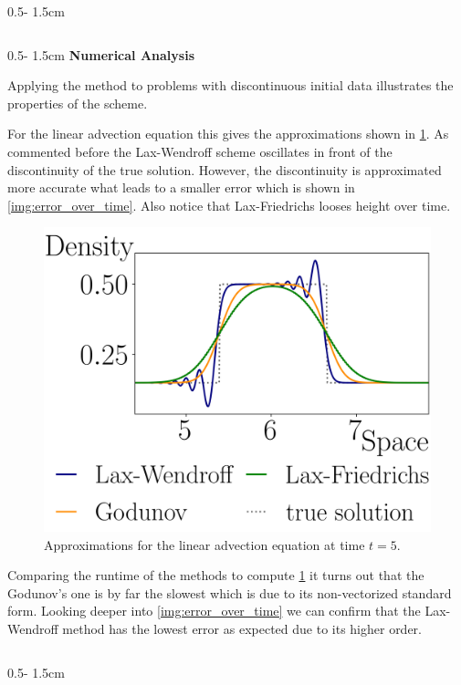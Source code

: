 \documentclass{uibposter}
\begin{document}
\begin{frame}[fragile]
\begin{columns}
\begin{column}{0.5\textwidth - 1.5cm}
\begin{column}{0.5\textwidth - 1.5cm}
\vspace{0.5cm}
\textbf{Numerical Analysis}
\vspace{0.5cm}
    
Applying the method to problems with discontinuous initial data illustrates the properties of the scheme.

\vspace{0.5cm}
For the linear advection equation this gives the approximations shown in \cref{img:linar_comprehension}. 
As commented before the Lax-Wendroff scheme oscillates in front of the discontinuity of the true solution. However, the discontinuity is approximated more accurate what leads to a smaller error which is shown in \cref{img:error_over_time}. Also notice that Lax-Friedrichs looses height over time. 

\begin{figure}[h]
	\includegraphics{fig/linear_compare.png}
	\caption{Approximations for the linear advection equation at time $t = 5$.}
	\label{img:linar_comprehension}
\end{figure}

Comparing the runtime of the methods to compute \cref{img:linar_comprehension} it turns out that the Godunov's one is by far the slowest which is due to its non-vectorized standard form.
Looking deeper into \cref{img:error_over_time} we can confirm that the Lax-Wendroff method has the lowest error as expected due to its higher order.

\end{column}
\begin{column}{0.5\textwidth - 1.5cm}
	\vspace*{-1.7cm} 


\end{column}
\end{column}
\end{columns}
\end{frame}
\end{document}
